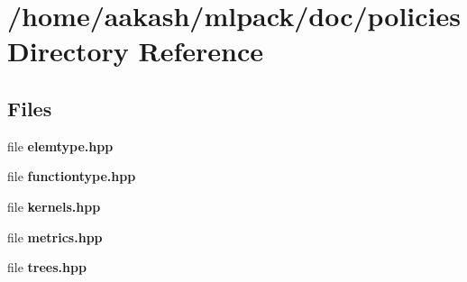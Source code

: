 \section{/home/aakash/mlpack/doc/policies Directory Reference}
\label{dir_2630b423a4c4e159d091c9f74d845bea}
\subsection*{Files}
\begin{DoxyCompactItemize}
\item 
file \textbf{ elemtype.\+hpp}
\item 
file \textbf{ functiontype.\+hpp}
\item 
file \textbf{ kernels.\+hpp}
\item 
file \textbf{ metrics.\+hpp}
\item 
file \textbf{ trees.\+hpp}
\end{DoxyCompactItemize}
